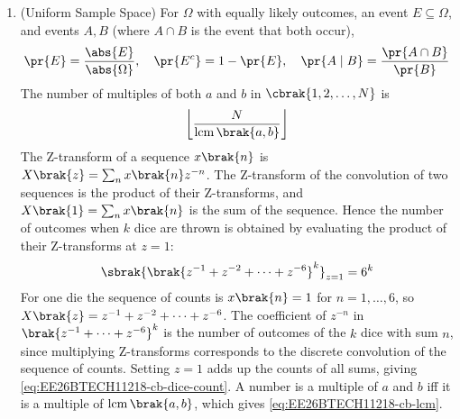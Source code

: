 \begin{enumerate}[label=\thesubsection.\arabic*, ref=\thesubsection.\theenumi,itemsep=1.5em]
\item (Uniform Sample Space) For $\Omega$ with equally likely outcomes, an event $E\subseteq\Omega$, and events $A,B$ (where $A\cap B$ is the event that both occur),
\begin{align}
\pr{E} = \frac{\abs{E}}{\abs{\Omega}}, \quad \pr{E^{c}} = 1-\pr{E}, \quad
\pr{A\mid B} = \frac{\pr{A\cap B}}{\pr{B}}
\label{eq:EE26BTECH11218-cb-prob}
\end{align}
The number of multiples of both $a$ and $b$ in $\cbrak{1,2,\dots,N}$ is
\begin{align}
\left\lfloor\frac{N}{\operatorname{lcm}\brak{a,b}}\right\rfloor
\label{eq:EE26BTECH11218-cb-lcm}
\end{align}
The Z-transform of a sequence $x\brak{n}$ is $X\brak{z}=\sum_{n}x\brak{n}z^{-n}$. The Z-transform of the convolution of two sequences is the product of their Z-transforms, and $X\brak{1}=\sum_nx\brak{n}$ is the sum of the sequence. Hence the number of outcomes when $k$ dice are thrown is obtained by evaluating the product of their Z-transforms at $z=1$:
\begin{align}
\sbrak{\brak{z^{-1}+z^{-2}+\cdots+z^{-6}}^k}_{z=1} = 6^k
\label{eq:EE26BTECH11218-cb-dice-count}
\end{align}
\solution For one die the sequence of counts is $x\brak{n}=1$ for $n=1,\dots,6$, so $X\brak{z}=z^{-1}+z^{-2}+\cdots+z^{-6}$. The coefficient of $z^{-n}$ in $\brak{z^{-1}+\cdots+z^{-6}}^k$ is the number of outcomes of the $k$ dice with sum $n$, since multiplying Z-transforms corresponds to the discrete convolution of the sequence of counts. Setting $z=1$ adds up the counts of all sums, giving \eqref{eq:EE26BTECH11218-cb-dice-count}. A number is a multiple of $a$ and $b$ iff it is a multiple of $\operatorname{lcm}\brak{a,b}$, which gives \eqref{eq:EE26BTECH11218-cb-lcm}.


\end{enumerate}
